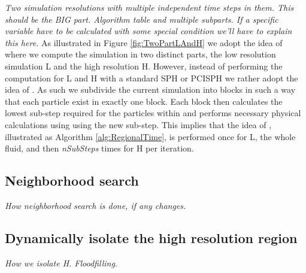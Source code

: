 \textit{Two simulation resolutions with multiple independent time steps in them. This should be the BIG part. Algorithm table and multiple subparts. If a specific variable have to be calculated with some special condition we'll have to explain this here.}
As illustrated in Figure \ref{fig:TwoPartLAndH} we adopt the idea of \cite{solenthaler2011two} where we compute the simulation in two distinct parts, the low resolution simulation L and the high resolution H. However, instead of performing the computation for L and H with a standard SPH or PCISPH we rather adopt the idea of \cite{goswami2014regional}. As such we subdivide the current simulation into blocks in such a way that each particle exist in exactly one block. Each block then calculates the lowest sub-step required for the particles within and performs necessary physical calculations using using the new sub-step. This implies that the idea of \cite{goswami2014regional}, illustrated as Algorithm \ref{alg:RegionalTime}, is performed once for L, the whole fluid, and then \textit{nSubSteps} times for H per iteration.

\subsection{Neighborhood search}
\textit{How neighborhood search is done, if any changes.}


\subsection{Dynamically isolate the high resolution region}
\textit{How we isolate H. Floodfilling.}
